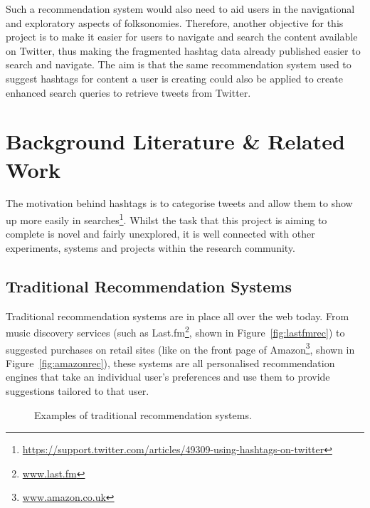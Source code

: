 \documentclass[11pt,a4paper]{report}
\begin{document}
Such a recommendation system would also need to aid users in the navigational and exploratory aspects of folksonomies. Therefore, another objective for this project is to make it easier for users to navigate and search the content available on Twitter, thus making the fragmented hashtag data already published easier to search and navigate. The aim is that the same recommendation system used to suggest hashtags for content a user is creating could also be applied to create enhanced search queries to retrieve tweets from Twitter.

\pagebreak

\chapter{Background Literature \& Related Work}
\label{chap:litreview}
The motivation behind hashtags is to categorise tweets and allow them to show up more easily in searches\footnote{\url{https://support.twitter.com/articles/49309-using-hashtags-on-twitter}}. Whilst the task that this project is aiming to complete is novel and fairly unexplored, it is well connected with other experiments, systems and projects within the research community.

\section{Traditional Recommendation Systems}
Traditional recommendation systems are in place all over the web today. From music discovery services (such as Last.fm\footnote{\url{www.last.fm}}, shown in Figure~\ref{fig:lastfmrec}) to suggested purchases on retail sites (like on the front page of Amazon\footnote{\url{www.amazon.co.uk}}, shown in Figure~\ref{fig:amazonrec}), these systems are all personalised recommendation engines that take an individual user's preferences and use them to provide suggestions tailored to that user.

\begin{figure}[htpb]
    \centering
    \caption{Examples of traditional recommendation systems.}
\end{figure}
\end{document}
